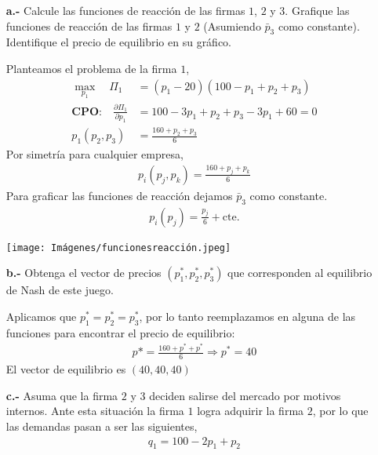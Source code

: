 \begin{itemize}
    \item [\textbf{a.-}] Calcule las funciones de reacción de las firmas $1$, $2$ y $3$. Grafique las funciones de reacción de las firmas $1$ y $2$ (Asumiendo $\bar{p}_3$ como constante). Identifique el precio de equilibrio en su gráfico.
    \begin{solution}
        Planteamos el problema de la firma $1$, 
        \begin{align*}
            \max_{p_1}\quad \Pi_1 &= (p_1 -20) (100-p_1 +p_2 + p_3) \\
            \textbf{CPO:} \quad \frac{\partial \Pi_1}{\partial p_1} &= 100-3p_1+p_2+p_3 -3p_1 +60 = 0 \\
            p_1(p_2,p_3) &= \frac{160+p_2+p_3}{6}
        \end{align*}
        Por simetría para cualquier empresa,
        \begin{align*}
            p_i(p_j,p_k) = \frac{160 + p_j + p_k}{6}
        \end{align*}
        Para graficar las funciones de reacción dejamos $\bar{p}_3$ como constante.
        \begin{align*}
            p_i(p_j) = \frac{p_j}{6} + \text{cte.}
        \end{align*}
        \begin{center}
            \texttt{[image: Imágenes/funcionesreacción.jpeg]}
        \end{center}
    \end{solution} 
    \item [\textbf{b.-}] Obtenga el vector de precios $(p_1^*,p_2^*,p_3^*)$ que corresponden al equilibrio de Nash de este juego.
    \begin{solution}
        Aplicamos que $p^*_1=p^*_2=p_3^*$, por lo tanto reemplazamos en alguna de las funciones para encontrar el precio de equilibrio:
        \begin{align*}
            p* = \frac{160+p^*+p^*}{6} \Longrightarrow p^* = 40
        \end{align*}
        El vector de equilibrio es $(40,40,40)$
    \end{solution}
    \item [\textbf{c.-}] Asuma que la firma $2$ y $3$ deciden salirse del mercado por motivos internos. Ante esta situación la firma $1$ logra adquirir la firma $2$, por lo que las demandas pasan a ser las siguientes,
    \begin{align*}
        q_1 = 100 -2p_1 +p_2 \\

\end{align*}
\end{itemize}

